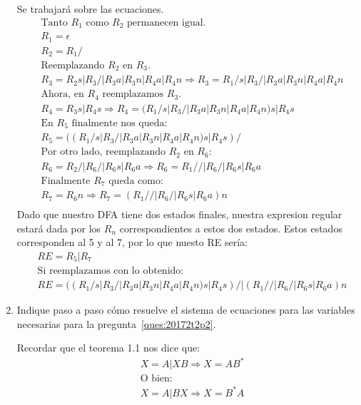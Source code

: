 \documentclass[spanish, fleqn]{article}
\begin{document}
\begin{enumerate}
    Se trabajará sobre las ecuaciones.
    \begin{align*}
    &\text{Tanto $R_1$ como $R_2$ permanecen igual.}\\
    &R_{1}=\epsilon \\
    &R_{2}=R_{1}/\\
    &\text{Reemplazando $R_2$ en $R_3$.}\\
    &R_{3}=R_{2}s|R_{3}/|R_{3}a|R_{3}n|R_{4}a|R_{4}n \Rightarrow  R_{3}=R_{1}/s|R_{3}/|R_{3}a|R_{3}n|R_{4}a|R_{4}n\\
    &\text{Ahora, en $R_4$ reemplazamos $R_3$.}\\
    &R_4=R_{3}s|R_{4}s \Rightarrow R_4=(R_{1}/s|R_{3}/|R_{3}a|R_{3}n|R_{4}a|R_{4}n)s|R_4s\\
    &\text{En $R_5$ finalmente nos queda:}\\
    &R_{5}=((R_{1}/s|R_{3}/|R_{3}a|R_{3}n|R_{4}a|R_{4}n)s|R_4s)/\\
    &\text{Por otro lado, reemplazando $R_2$ en $R_6$:}\\
    &R_6=R_{2}/|R_{6}/|R_{6}s|R_{6}a \Rightarrow R_6=R_{1}//|R_{6}/|R_{6}s|R_{6}a\\
    &\text{Finalmente $R_7$ queda como:}\\
    &R_7=R_6n \Rightarrow R_7=(R_{1}//|R_{6}/|R_{6}s|R_{6}a)n\\
    \end{align*}    
    Dado que nuestro DFA tiene dos estados finales, nuestra expresion regular estará dada por los $R_n$ correspondientes a estos
    dos estados. Estos estados corresponden al 5 y al 7, por lo que nuesto RE sería:
    \begin{align*}
	&RE=R_5 | R_7\\
    &\text{Si reemplazamos con lo obtenido:}\\
    &RE=((R_{1}/s|R_{3}/|R_{3}a|R_{3}n|R_{4}a|R_{4}n)s|R_4s)/|(R_{1}//|R_{6}/|R_{6}s|R_{6}a)n
    \end{align*}
        
  \item %
    Indique paso a paso cómo resuelve el sistema de ecuaciones
    para las variables necesarias para la pregunta~\ref{ques:20172t2p2}.
	
	Recordar que el teorema 1.1 nos dice que:
	\begin{align*}
	&X = A | XB \Rightarrow X = AB^*\\
	&\text{O bien:}\\
	&X = A | BX \Rightarrow X = B^*A
	\end{align*}	    
    

\end{enumerate}
\end{document}
